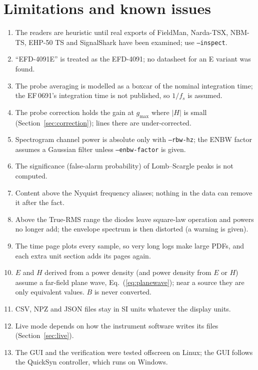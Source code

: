 \documentclass[10pt,letterpaper]{article}
\numberwithin{equation}{section}
\begin{document}
\section{Limitations and known issues}\label{sec:limits}
\begin{enumerate}
\item The readers are heuristic until real exports of FieldMan, Narda-TSX,
NBM-TS, EHP-50 TS and SignalShark have been examined; use \texttt{--inspect}.
\item ``EFD-4091E'' is treated as the EFD-4091; no datasheet for an E variant
was found.
\item The probe averaging is modelled as a boxcar of the nominal integration
time; the EF\,0691's integration time is not published, so $1/f_s$ is assumed.
\item The probe correction holds the gain at $g_\mathrm{max}$ where $|H|$ is small
(Section~\ref{sec:correction}); lines there are under-corrected.
\item Spectrogram channel power is absolute only with \texttt{--rbw-hz}; the
ENBW factor assumes a Gaussian filter unless \texttt{--enbw-factor} is given.
\item The significance (false-alarm probability) of Lomb--Scargle peaks is not
computed.
\item Content above the Nyquist frequency aliases; nothing in the data can
remove it after the fact.
\item Above the True-RMS range the diodes leave square-law operation and powers
no longer add; the envelope spectrum is then distorted (a warning is given).
\item The time page plots every sample, so very long logs make large PDFs, and
each extra unit section adds its pages again.
\item $E$ and $H$ derived from a power density (and power density from $E$ or
$H$) assume a far-field plane wave, Eq.~(\ref{eq:planewave}); near a source they
are only equivalent values. $B$ is never converted.
\item CSV, NPZ and JSON files stay in SI units whatever the display units.
\item Live mode depends on how the instrument software writes its files
(Section~\ref{sec:live}).
\item The GUI and the verification were tested offscreen on Linux; the GUI follows
the QuickSyn controller, which runs on Windows.
\end{enumerate}
\end{document}
